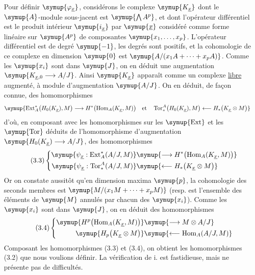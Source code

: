 Pour définir $\symup{\varphi_{\underline{x}}}$, considérons le complexe
$\symup{K_{\underline{x}}}$ dont le $\symup{A}$-module sous-jacent est $\symup{\bigwedge A^{p}}$, et
dont l'opérateur différentiel est le produit intérieur $\symup{i_{\underline{x}}}$ par
$\symup{\underline{x}}$ considéré comme forme linéaire sur $\symup{A^{p}}$ de composantes
$\symup{x_1,\ldots,x_p}$. L'opérateur différentiel est de degré $\symup{-1}$, les degrés sont
positifs, et la cohomologie de ce complexe en dimension $\symup{0}$ est
$\symup{A/(x_1A+\cdots+x_pA)}$. Comme les $\symup{x_i}$ sont dans $\symup{J}$, on en déduit une
augmentation $\symup{K_{\underline{x},0}\longrightarrow A/J}$. Ainsi
$\symup{K_{\underline{x}}}$ apparaît comme un complexe \uline{libre} augmenté, à module
d'augmentation $\symup{A/J}$. On en déduit, de façon connue, des homomorphismes
\[
\symup{\operatorname{Ext}_{A}^{*}\bigl(H_0(K_{\underline{x}}),M\bigr)
\longrightarrow
H^{*}\bigl(\operatorname{Hom}_{A}(K_{\underline{x}},M)\bigr)\quad\text{et}\quad
\operatorname{Tor}_{*}^{A}\bigl(H_0(K_{\underline{x}}),M\bigr)
\longleftarrow
H_{*}\bigl(K_{\underline{x}}\otimes M\bigr)}
\]
d'où, en composant avec les homomorphismes sur les $\symup{\operatorname{Ext}}$ et les
$\symup{\operatorname{Tor}}$ déduits de l'homomorphisme d'augmentation
$\symup{H_0(K_{\underline{x}})\longrightarrow A/J}$, des homomorphismes
\begin{equation}\tag{3.3}
\left\{
\begin{aligned}\symup{\psi_{\underline{x}}:
\operatorname{Ext}_{A}^{*}(A/J,M)}&\symup{\longrightarrow H^{*}\bigl(\operatorname{Hom}_{A}(K_{\underline{x}},M)\bigr)}\\\symup{\psi_{\underline{x}}:
\operatorname{Tor}_{*}^{A}(A/J,M)}&\symup{\longleftarrow H_{*}\bigl(K_{\underline{x}}\otimes M\bigr)}\end{aligned}
\right.
\end{equation}
Or on constate aussitôt qu'en dimension maxima $\symup{p}$, la cohomologie des seconds
membres est $\symup{M/(x_1M+\cdots+x_pM)}$ (resp. est l'ensemble des éléments de $\symup{M}$
annulés par chacun des $\symup{x_i}$). Comme les $\symup{x_i}$ sont dans $\symup{J}$, on en déduit des
homomorphismes
\begin{equation}\tag{3.4}
\left\{
\begin{aligned}\symup{H^{p}\bigl(\operatorname{Hom}_{A}(K_{\underline{x}},M)\bigr)}&\symup{\longrightarrow M\otimes A/J}\\\symup{H_{p}\bigl(K_{\underline{x}}\otimes M\bigr)}&\symup{\longleftarrow\operatorname{Hom}_{A}(A/J,M)}\end{aligned}
\right.
\end{equation}
Composant les homomorphismes (3.3) et (3.4), on obtient les homomorphismes (3.2)
que nous voulions définir. La vérification de i. est fastidieuse, mais ne
présente pas de difficultés.

